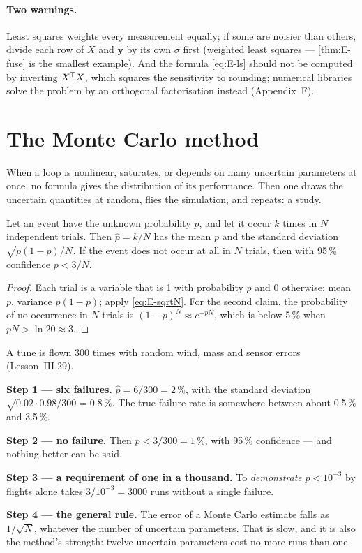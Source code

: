 \paragraph{Two warnings.} Least squares weights every measurement equally; if some are noisier than others, divide each row of $X$ and $\symbf y$ by its own $\sigma$ first (weighted least squares — \cref{thm:E-fuse} is the smallest example). And the formula \eqref{eq:E-ls} should not be computed by inverting $X^{\mathsf{T}} X$, which squares the sensitivity to rounding; numerical libraries solve the problem by an orthogonal factorisation instead (Appendix~F).

\section{The Monte Carlo method}

When a loop is nonlinear, saturates, or depends on many uncertain parameters at once, no formula gives the distribution of its performance. Then one draws the uncertain quantities at random, flies the simulation, and repeats: a  study.

\begin{theorem}
\label{thm:E-mc}
Let an event have the unknown probability $p$, and let it occur $k$ times in $N$ independent trials. Then $\hat p = k/N$ has the mean $p$ and the standard deviation $\sqrt{p(1 - p)/N}$. If the event does not occur at all in $N$ trials, then with 95\,\% confidence $p < 3/N$.
\end{theorem}
\begin{proof}
Each trial is a variable that is 1 with probability $p$ and 0 otherwise: mean $p$, variance $p(1 - p)$; apply \cref{eq:E-sqrtN}. For the second claim, the probability of no occurrence in $N$ trials is $(1 - p)^N \approx e^{-pN}$, which is below 5\,\% when $pN > \ln 20 \approx 3$.
\end{proof}

\begin{example}
\label{ex:E-mc}
A tune is flown 300 times with random wind, mass and sensor errors (Lesson~III.29).

\textbf{Step 1 — six failures.} $\hat p = 6/300 = 2\,\%$, with the standard deviation $\sqrt{0.02 \cdot 0.98/300} = 0.8\,\%$. The true failure rate is somewhere between about 0.5\,\% and 3.5\,\%.

\textbf{Step 2 — no failure.} Then $p < 3/300 = 1\,\%$, with 95\,\% confidence — and nothing better can be said.

\textbf{Step 3 — a requirement of one in a thousand.} To \emph{demonstrate} $p < 10^{-3}$ by flights alone takes $3/10^{-3} = 3000$ runs without a single failure.

\textbf{Step 4 — the general rule.} The error of a Monte Carlo estimate falls as $1/\sqrt N$, whatever the number of uncertain parameters. That is slow, and it is also the method's strength: twelve uncertain parameters cost no more runs than one.
\end{example}

